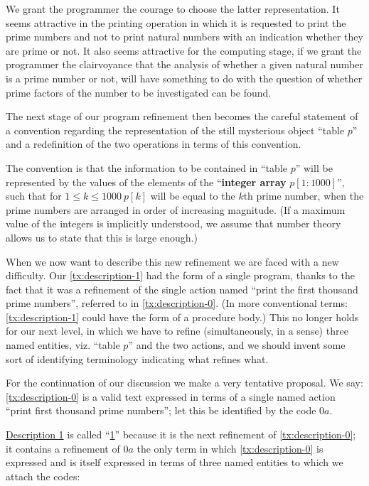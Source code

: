 We grant the programmer the courage to choose the latter representation. It seems attractive in the printing operation in which it is requested to print the prime numbers and not to print natural numbers with an indication whether they are prime or not. It also seems attractive for the computing stage, if we grant the programmer the clairvoyance that the analysis of whether a given natural number is a prime number or not, will have something to do with the question of whether prime factors of the number to be investigated can be found.

The next stage of our program refinement then becomes the careful statement of a convention regarding the representation of the still mysterious object ``table $p$'' and a redefinition of the two operations in terms of this convention.

The convention is that the information to be contained in ``table $p$'' will be represented by the values of the elements of the ``\textbf{integer array} $p[1 : 1000]$'', such that for $1 \leqslant k \leqslant 1000\ p[k]$ will be equal to the $k$th prime number, when the prime numbers are arranged in order of increasing magnitude. (If a maximum value of the integers is implicitly understood, we assume that number theory allows us to state that this is large enough.)

When we now want to describe this new refinement we are faced with a new difficulty. Our \ref{tx:description-1} had the form of a single program, thanks to the fact that it was a refinement of the single action named ``print the first thousand prime numbers'', referred to in \ref{tx:description-0}. (In more conventional terms: \ref{tx:description-1} could have the form of a procedure body.) This no longer holds for our next level, in which we have to refine (simultaneously, in a sense) three named entities, viz. ``table $p$'' and the two actions, and we should invent some sort of identifying terminology indicating what refines what.

For the continuation of our discussion we make a very tentative proposal. We say: \ref{tx:description-0} is a valid text expressed in terms of a single named action ``print first thousand prime numbers''; let this be identified by the code $0a$.

\hyperref[tx:description-1]{Description 1} is called ``\hyperref[tx:description-1]{1}'' because it is the next refinement of \ref{tx:description-0}; it contains a refinement of $0a$ \textemdash{}  the only term in which \ref{tx:description-0} is expressed \textemdash{}  and is itself expressed in terms of three named entities to which we attach the codes:


